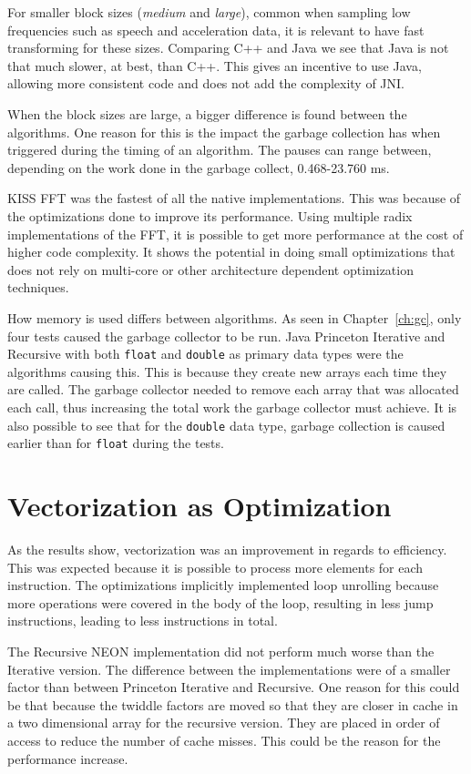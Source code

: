 For smaller block sizes (\emph{medium} and \emph{large}), common when sampling low frequencies such as speech and acceleration data, it is relevant to have fast transforming for these sizes. Comparing C++ and Java we see that Java is not that much slower, at best, than C++. This gives an incentive to use Java, allowing more consistent code and does not add the complexity of JNI.

When the block sizes are large, a bigger difference is found between the algorithms. One reason for this is the impact the garbage collection has when triggered during the timing of an algorithm. The pauses can range between, depending on the work done in the garbage collect, 0.468-23.760 ms.

KISS FFT was the fastest of all the native implementations. This was because of the optimizations done to improve its performance. Using multiple radix implementations of the FFT, it is possible to get more performance at the cost of higher code complexity. It shows the potential in doing small optimizations that does not rely on multi-core or other architecture dependent optimization techniques.

How memory is used differs between algorithms. As seen in Chapter~\ref{ch:gc}, only four tests caused the garbage collector to be run. Java Princeton Iterative and Recursive with both \texttt{float} and \texttt{double} as primary data types were the algorithms causing this. This is because they create new arrays each time they are called. The garbage collector needed to remove each array that was allocated each call, thus increasing the total work the garbage collector must achieve. It is also possible to see that for the \texttt{double} data type, garbage collection is caused earlier than for \texttt{float} during the tests.

\section{Vectorization as Optimization}

As the results show, vectorization was an improvement in regards to efficiency. This was expected because it is possible to process more elements for each instruction. The optimizations implicitly implemented loop unrolling because more operations were covered in the body of the loop, resulting in less jump instructions, leading to less instructions in total.

The Recursive NEON implementation did not perform much worse than the Iterative version. The difference between the implementations were of a smaller factor than between Princeton Iterative and Recursive. One reason for this could be that because the twiddle factors are moved so that they are closer in cache in a two dimensional array for the recursive version. They are placed in order of access to reduce the number of cache misses. This could be the reason for the performance increase.

